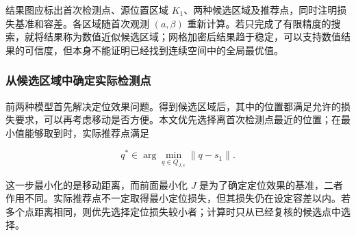结果图应标出首次检测点、源位置区域 \(K_1\)、两种候选区域及推荐点，同时注明损失基准和容差。各区域随首次观测 \((a,\beta)\) 重新计算。若只完成了有限精度的搜索，就将结果称为数值近似候选区域；网格加密后结果趋于稳定，可以支持数值结果的可信度，但本身不能证明已经找到连续空间中的全局最优值。

\subsubsection{从候选区域中确定实际检测点}

前两种模型首先解决定位效果问题。得到候选区域后，其中的位置都满足允许的损失要求，可以再考虑移动是否方便。本文优先选择离首次检测点最近的位置；在最小值能够取到时，实际推荐点满足

\begin{equation}
 q^*\in\arg\min_{q\in Q_{J,\epsilon}}\|q-s_1\|.
 \label{eq:q2-candidate-selection}
\end{equation}

这一步最小化的是移动距离，而前面最小化 \(J\) 是为了确定定位效果的基准，二者作用不同。实际推荐点不一定取得最小定位损失，但其损失仍在设定容差以内。若多个点距离相同，则优先选择定位损失较小者；计算时只从已经复核的候选点中选择。
